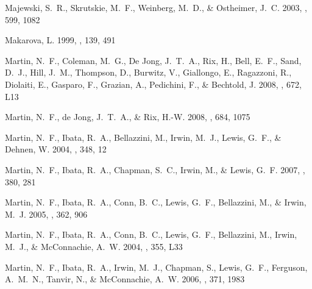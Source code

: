 \documentclass[manuscript]{aastex}
\begin{document}
\begin{thebibliography}{381}
{Majewski}, S.~R., {Skrutskie}, M.~F., {Weinberg}, M.~D., \& {Ostheimer}, J.~C.
  2003, \apj, 599, 1082

{Makarova}, L. 1999, \aaps, 139, 491

{Martin}, N.~F., {Coleman}, M.~G., {De Jong}, J.~T.~A., {Rix}, H., {Bell},
  E.~F., {Sand}, D.~J., {Hill}, J.~M., {Thompson}, D., {Burwitz}, V.,
  {Giallongo}, E., {Ragazzoni}, R., {Diolaiti}, E., {Gasparo}, F., {Grazian},
  A., {Pedichini}, F., \& {Bechtold}, J. 2008{}, \apjl, 672, L13

{Martin}, N.~F., {de Jong}, J.~T.~A., \& {Rix}, H.-W. 2008{}, \apj,
  684, 1075

{Martin}, N.~F., {Ibata}, R.~A., {Bellazzini}, M., {Irwin}, M.~J., {Lewis},
  G.~F., \& {Dehnen}, W. 2004{}, \mnras, 348, 12

{Martin}, N.~F., {Ibata}, R.~A., {Chapman}, S.~C., {Irwin}, M., \& {Lewis},
  G.~F. 2007, \mnras, 380, 281

{Martin}, N.~F., {Ibata}, R.~A., {Conn}, B.~C., {Lewis}, G.~F., {Bellazzini},
  M., \& {Irwin}, M.~J. 2005, \mnras, 362, 906

{Martin}, N.~F., {Ibata}, R.~A., {Conn}, B.~C., {Lewis}, G.~F., {Bellazzini},
  M., {Irwin}, M.~J., \& {McConnachie}, A.~W. 2004{}, \mnras, 355,
  L33

{Martin}, N.~F., {Ibata}, R.~A., {Irwin}, M.~J., {Chapman}, S., {Lewis}, G.~F.,
  {Ferguson}, A.~M.~N., {Tanvir}, N., \& {McConnachie}, A.~W. 2006, \mnras,
  371, 1983


\end{thebibliography}
\end{document}
